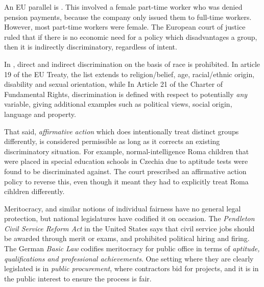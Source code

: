 {An EU parallel is \citet{bilka1986}. This involved a female part-time worker who was denied pension payments, because the company only issued them to full-time workers. However, most part-time workers were female. The European court of justice ruled that if there is no economic need for a policy which disadvantages a group, then it is indirectly discriminatory, regardless of intent.

In \citet{eu2000racial}, direct and indirect discrimination on the basis of race is prohibited. In article 19 of the EU Treaty, the list extends to religion/belief, age, racial/ethnic origin, disability and sexual orientation,  while In Article 21 of the Charter of Fundamental Rights, discrimination is defined with respect to potentially \emph{any} variable, giving additional examples such as political views, social origin, language and property.

That said, \emph{affirmative action} which does intentionally treat distinct groups differently, is considered permissible as long as it corrects an existing discriminatory situation. For example, normal-intelligence Roma children that were placed in special education schools in Czechia due to aptitude tests were found to be discriminated against. The court prescribed an affirmative action policy to reverse this, even though it meant they had to explicitly treat Roma cihldren differently.


  Meritocracy, and similar notions of individual fairness have no general legal protection, but national legislatures have codified it on occasion. The \emph{Pendleton Civil Service Reform Act} in the United States says that civil service jobs should be awarded through merit or exams, and prohibited political hiring and firing. The German \emph{Basic Law} codifies meritocracy for public office in terms of \emph{aptitude, qualifications and professional achievements}. One setting where they are clearly legislated is in \emph{public procurement}, where contractors bid for projects, and it is in the public interest to ensure the process is fair. 
  }


